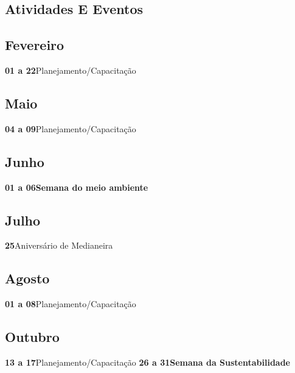 \documentclass[thesis]{hmcposter}
\begin{document}
\begin{poster}
\normalsize \section{\color{hmcorange}Atividades E Eventos}\subsection{Fevereiro}\textbf{01 a 22}\quad \quad Planejamento/Capacitação \newline\subsection{Maio}\textbf{04 a 09}\quad \quad Planejamento/Capacitação \newline\subsection{Junho}\textbf{01 a 06}\quad \quad \textbf{Semana do meio ambiente} \newline\subsection{Julho}\textbf{25}\quad \quad \quad \quad Aniversário de Medianeira \newline\subsection{Agosto}\textbf{01 a 08}\quad \quad Planejamento/Capacitação \newline\subsection{Outubro}\textbf{13 a 17}\quad \quad Planejamento/Capacitação \newline\textbf{26 a 31}\quad \quad \textbf{Semana da Sustentabilidade} \newline\end{poster}
\end{document}
